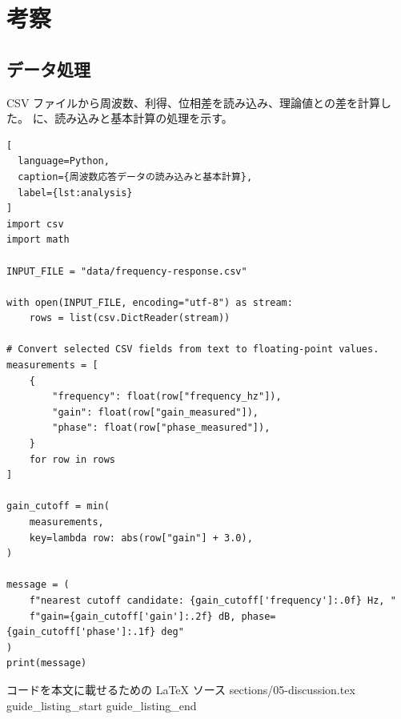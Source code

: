 \section{考察}
\label{sec:discussion}

\subsection{データ処理}
\label{subsec:data-processing}

CSV ファイルから周波数、利得、位相差を読み込み、理論値との差を計算した。
に、読み込みと基本計算の処理を示す。

\begin{lstlisting}[
  language=Python,
  caption={周波数応答データの読み込みと基本計算},
  label={lst:analysis}
]
import csv
import math

INPUT_FILE = "data/frequency-response.csv"

with open(INPUT_FILE, encoding="utf-8") as stream:
    rows = list(csv.DictReader(stream))

# Convert selected CSV fields from text to floating-point values.
measurements = [
    {
        "frequency": float(row["frequency_hz"]),
        "gain": float(row["gain_measured"]),
        "phase": float(row["phase_measured"]),
    }
    for row in rows
]

gain_cutoff = min(
    measurements,
    key=lambda row: abs(row["gain"] + 3.0),
)

message = (
    f"nearest cutoff candidate: {gain_cutoff['frequency']:.0f} Hz, "
    f"gain={gain_cutoff['gain']:.2f} dB, phase={gain_cutoff['phase']:.1f} deg"
)
print(message)
\end{lstlisting}

\SampleGuideSource
  {コードを本文に載せるための LaTeX ソース}
  {sections/05-discussion.tex}
  {guide_listing_start}
  {guide_listing_end}




